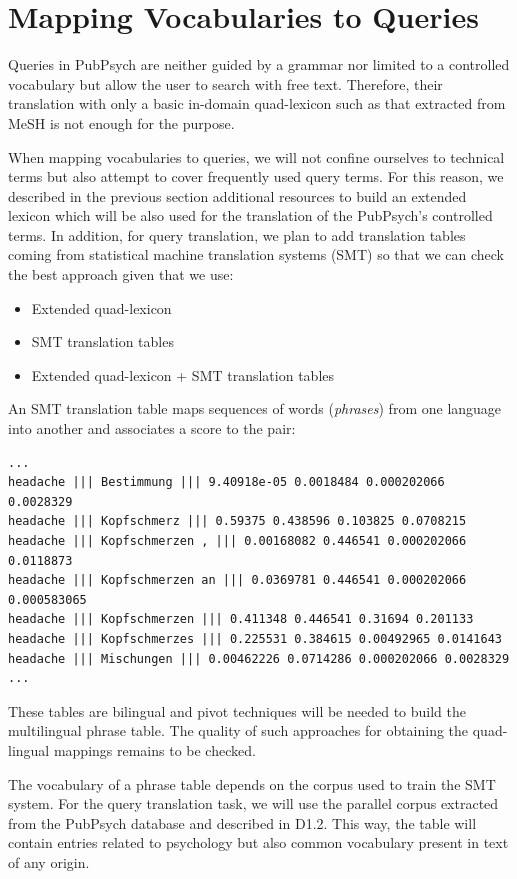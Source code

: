 \documentclass[a4paper,11pt]{article}
\begin{document}
\section{Mapping Vocabularies to Queries}
\label{s:smt}

Queries in PubPsych are neither guided by a grammar nor limited to a controlled vocabulary but allow the user to search with free text. Therefore, their translation with only a basic in-domain quad-lexicon such as that extracted from MeSH is not enough for the purpose.

When mapping vocabularies to queries, we will not confine ourselves to technical terms but also attempt to cover frequently used query terms. For this reason, we described in the previous section additional resources to build an extended lexicon which will be also used for the translation of the PubPsych's controlled terms. In addition, for query translation, we plan to add translation tables coming from statistical machine translation systems (SMT) so that we can check the best approach given that we use:

\begin{itemize}
 \item Extended quad-lexicon
 \item SMT translation tables
 \item Extended quad-lexicon + SMT translation tables 
\end{itemize}

An SMT translation table maps sequences of words (\emph{phrases}) from one language into another and associates a score to the pair:

{\small
\begin{verbatim}
...
headache ||| Bestimmung ||| 9.40918e-05 0.0018484 0.000202066 0.0028329
headache ||| Kopfschmerz ||| 0.59375 0.438596 0.103825 0.0708215 
headache ||| Kopfschmerzen , ||| 0.00168082 0.446541 0.000202066 0.0118873 
headache ||| Kopfschmerzen an ||| 0.0369781 0.446541 0.000202066 0.000583065 
headache ||| Kopfschmerzen ||| 0.411348 0.446541 0.31694 0.201133 
headache ||| Kopfschmerzes ||| 0.225531 0.384615 0.00492965 0.0141643 
headache ||| Mischungen ||| 0.00462226 0.0714286 0.000202066 0.0028329 
...
\end{verbatim}
}

These tables are bilingual and pivot techniques will be needed to build the multilingual phrase table. The quality of such approaches for obtaining the quad-lingual mappings remains to be checked.

The vocabulary of a phrase table depends on the corpus used to train the SMT system. For the query translation task, we will use the parallel corpus extracted from the PubPsych database and described in D1.2. This way, the table will contain entries related to psychology but also common vocabulary present in text of any origin.
\end{document}
